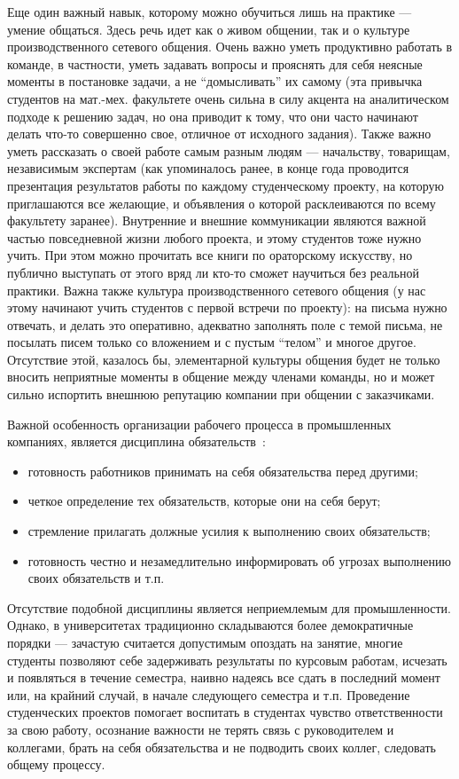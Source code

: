 \documentclass[a4paper]{article}
\begin{document}
Еще один важный навык, которому можно обучиться лишь на практике --- умение общаться. Здесь речь идет как о живом общении, так и о культуре производственного сетевого общения.  Очень важно уметь продуктивно работать в команде, в частности, уметь задавать вопросы и прояснять для себя неясные моменты в постановке задачи, а не ``домысливать'' их самому (эта привычка студентов на мат.-мех. факультете очень сильна в силу акцента на аналитическом подходе к решению задач, но она приводит к тому, что они часто начинают делать что-то совершенно свое, отличное от исходного задания). Также важно уметь рассказать о своей работе самым разным людям --- начальству, товарищам, независимым экспертам (как упоминалось ранее, в конце года проводится презентация результатов работы по каждому студенческому проекту, на которую приглашаются все желающие, и объявления о которой расклеиваются по всему факультету заранее). Внутренние и внешние коммуникации являются важной частью повседневной жизни любого проекта, и этому студентов тоже нужно учить. При этом можно прочитать все книги по ораторскому искусству, но публично выступать от этого вряд ли кто-то сможет научиться без реальной практики. Важна также культура производственного сетевого общения (у нас этому начинают учить студентов с первой встречи по проекту): на письма нужно отвечать, и делать это оперативно, адекватно заполнять поле с темой письма, не посылать писем только со вложением и с пустым ``телом'' и многое другое. Отсутствие этой, казалось бы, элементарной культуры общения будет не только вносить неприятные моменты в общение между членами команды, но и может сильно испортить внешнюю репутацию компании при общении с заказчиками.

Важной особенность организации рабочего процесса в промышленных компаниях, является дисциплина обязательств~\cite{obyzat}:
\begin{itemize}
 \item готовность работников принимать на себя обязательства перед другими;
 \item четкое определение тех обязательств, которые они на себя берут;
 \item стремление прилагать должные усилия к выполнению своих обязательств;
 \item готовность честно и незамедлительно информировать об угрозах выполнению своих обязательств и т.п.
\end{itemize}
Отсутствие подобной дисциплины является неприемлемым для промышленности. Однако, в университетах традиционно складываются более демократичные порядки --- зачастую считается допустимым опоздать на занятие, многие студенты позволяют себе задерживать результаты по курсовым работам, исчезать и появляться в течение семестра, наивно надеясь все сдать в последний момент или, на крайний случай, в начале следующего семестра и т.п. Проведение студенческих проектов помогает воспитать в студентах чувство ответственности за свою работу, осознание важности не терять связь с руководителем и коллегами, брать на себя обязательства и не подводить своих коллег, следовать общему процессу.
\end{document}
